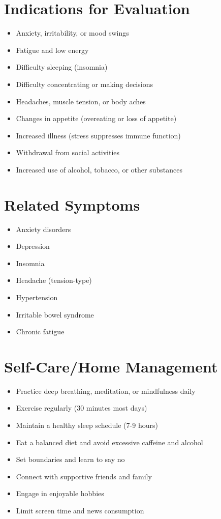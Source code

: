 \section{Indications for Evaluation}
\begin{itemize}
\item Anxiety, irritability, or mood swings
\item Fatigue and low energy
\item Difficulty sleeping (insomnia)
\item Difficulty concentrating or making decisions
\item Headaches, muscle tension, or body aches
\item Changes in appetite (overeating or loss of appetite)
\item Increased illness (stress suppresses immune function)
\item Withdrawal from social activities
\item Increased use of alcohol, tobacco, or other substances
\end{itemize}

\section{Related Symptoms}
\begin{itemize}
\item Anxiety disorders
\item Depression
\item Insomnia
\item Headache (tension-type)
\item Hypertension
\item Irritable bowel syndrome
\item Chronic fatigue
\end{itemize}

\section{Self-Care/Home Management}
\begin{itemize}
\item Practice deep breathing, meditation, or mindfulness daily
\item Exercise regularly (30 minutes most days)
\item Maintain a healthy sleep schedule (7-9 hours)
\item Eat a balanced diet and avoid excessive caffeine and alcohol
\item Set boundaries and learn to say no
\item Connect with supportive friends and family
\item Engage in enjoyable hobbies
\item Limit screen time and news consumption
\end{itemize}

